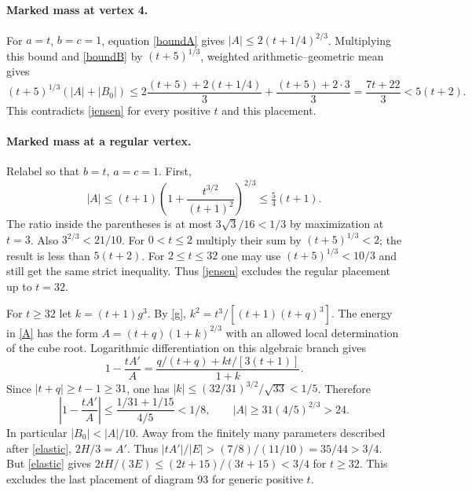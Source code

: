 \documentclass[11pt]{article}
\begin{document}
\paragraph{Marked mass at vertex 4.}
For $a=t$, $b=c=1$, equation \eqref{boundA} gives $|A|\le2(t+1/4)^{2/3}$. Multiplying this bound and \eqref{boundB} by $(t+5)^{1/3}$, weighted arithmetic--geometric mean gives
\[
 (t+5)^{1/3}(|A|+|B_0|)\le
 2\frac{(t+5)+2(t+1/4)}3+\frac{(t+5)+2\cdot3}{3}
 =\frac{7t+22}{3}<5(t+2).
\]
This contradicts \eqref{jensen} for every positive $t$ and this placement.
\paragraph{Marked mass at a regular vertex.}
Relabel so that $b=t$, $a=c=1$. First,
\[
 |A|\le (t+1)\left(1+\frac{t^{3/2}}{(t+1)^2}\right)^{2/3}\le\tfrac54(t+1).
\]
The ratio inside the parentheses is at most $3\sqrt3/16<1/3$ by maximization at $t=3$. Also $3^{2/3}<21/10$. For $0<t\le2$ multiply their sum by $(t+5)^{1/3}<2$; the result is less than $5(t+2)$. For $2\le t\le32$ one may use $(t+5)^{1/3}<10/3$ and still get the same strict inequality. Thus \eqref{jensen} excludes the regular placement up to $t=32$.

For $t\ge32$ let $k=(t+1)g^3$. By \eqref{g}, $k^2=t^3/[(t+1)(t+q)^3]$. The energy in \eqref{A} has the form $A=(t+q)(1+k)^{2/3}$ with an allowed local determination of the cube root. Logarithmic differentiation on this algebraic branch gives
\[
 1-\frac{t A'}{A}=\frac{q/(t+q)+kt/[3(t+1)]}{1+k}.
\]
Since $|t+q|\ge t-1\ge31$, one has $|k|\le (32/31)^{3/2}/\sqrt{33}<1/5$. Therefore
\[
 \left|1-\frac{t A'}{A}\right|
 \le \frac{1/31+1/15}{4/5}<1/8,\qquad |A|\ge31(4/5)^{2/3}>24.
\]
In particular $|B_0|<|A|/10$. Away from the finitely many parameters described after \eqref{elastic}, $2H/3=A'$. Thus $|tA'|/|E|>(7/8)/(11/10)=35/44>3/4$. But \eqref{elastic} gives $2tH/(3E)\le(2t+15)/(3t+15)<3/4$ for $t\ge32$. This excludes the last placement of diagram 93 for generic positive $t$.
\end{document}

